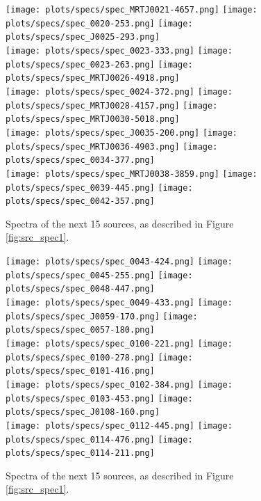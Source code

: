 \documentclass[preprint]{aastex}
\begin{document}
\begin{figure}\centering
\texttt{[image: plots/specs/spec\_MRTJ0021-4657.png]}
\texttt{[image: plots/specs/spec\_0020-253.png]}
\texttt{[image: plots/specs/spec\_J0025-293.png]}\\
\texttt{[image: plots/specs/spec\_0023-333.png]}
\texttt{[image: plots/specs/spec\_0023-263.png]}
\texttt{[image: plots/specs/spec\_MRTJ0026-4918.png]}\\
\texttt{[image: plots/specs/spec\_0024-372.png]}
\texttt{[image: plots/specs/spec\_MRTJ0028-4157.png]}
\texttt{[image: plots/specs/spec\_MRTJ0030-5018.png]}\\
\texttt{[image: plots/specs/spec\_J0035-200.png]}
\texttt{[image: plots/specs/spec\_MRTJ0036-4903.png]}
\texttt{[image: plots/specs/spec\_0034-377.png]}\\
\texttt{[image: plots/specs/spec\_MRTJ0038-3859.png]}
\texttt{[image: plots/specs/spec\_0039-445.png]}
\texttt{[image: plots/specs/spec\_0042-357.png]}\\
\caption{Spectra of the next 15 sources, as described in Figure \ref{fig:src_spec1}.
}\label{fig:src_spec2}
\end{figure}\clearpage

\begin{figure}\centering
\texttt{[image: plots/specs/spec\_0043-424.png]}
\texttt{[image: plots/specs/spec\_0045-255.png]}
\texttt{[image: plots/specs/spec\_0048-447.png]}\\
\texttt{[image: plots/specs/spec\_0049-433.png]}
\texttt{[image: plots/specs/spec\_J0059-170.png]}
\texttt{[image: plots/specs/spec\_0057-180.png]}\\
\texttt{[image: plots/specs/spec\_0100-221.png]}
\texttt{[image: plots/specs/spec\_0100-278.png]}
\texttt{[image: plots/specs/spec\_0101-416.png]}\\
\texttt{[image: plots/specs/spec\_0102-384.png]}
\texttt{[image: plots/specs/spec\_0103-453.png]}
\texttt{[image: plots/specs/spec\_J0108-160.png]}\\
\texttt{[image: plots/specs/spec\_0112-445.png]}
\texttt{[image: plots/specs/spec\_0114-476.png]}
\texttt{[image: plots/specs/spec\_0114-211.png]}\\
\caption{Spectra of the next 15 sources, as described in Figure \ref{fig:src_spec1}.
}\label{fig:src_spec3}
\end{figure}\clearpage
\end{document}
